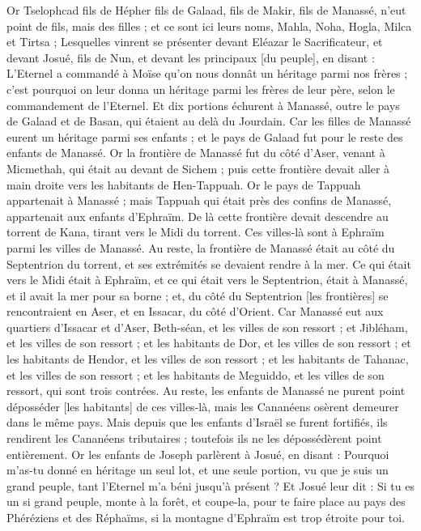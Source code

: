 \begin{multicols}{2}
Or Tselophcad fils de Hépher fils de Galaad, fils de Makir, fils de Manassé, n'eut point de fils, mais des filles ; et ce sont ici leurs noms, Mahla, Noha, Hogla, Milca et Tirtsa ;
Lesquelles vinrent se présenter devant Eléazar le Sacrificateur, et devant Josué, fils de Nun, et devant les principaux [du peuple], en disant : L'Eternel a commandé à Moïse qu'on nous donnât un héritage parmi nos frères ; c'est pourquoi on leur donna un héritage parmi les frères de leur père, selon le commandement de l'Eternel.
Et dix portions échurent à Manassé, outre le pays de Galaad et de Basan, qui étaient au delà du Jourdain.
Car les filles de Manassé eurent un héritage parmi ses enfants ; et le pays de Galaad fut pour le reste des enfants de Manassé.
Or la frontière de Manassé fut du côté d'Aser, venant à Micmethah, qui était au devant de Sichem ; puis cette frontière devait aller à main droite vers les habitants de Hen-Tappuah.
Or le pays de Tappuah appartenait à Manassé ; mais Tappuah qui était près des confins de Manassé, appartenait aux enfants d'Ephraïm.
De là cette frontière devait descendre au torrent de Kana, tirant vers le Midi du torrent. Ces villes-là sont à Ephraïm parmi les villes de Manassé. Au reste, la frontière de Manassé était au côté du Septentrion du torrent, et ses extrémités se devaient rendre à la mer.
Ce qui était vers le Midi était à Ephraïm, et ce qui était vers le Septentrion, était à Manassé, et il avait la mer pour sa borne ; et, du côté du Septentrion [les frontières] se rencontraient en Aser, et en Issacar, du côté d'Orient.
Car Manassé eut aux quartiers d'Issacar et d'Aser, Beth-séan, et les villes de son ressort ; et Jibléham, et les villes de son ressort ; et les habitants de Dor, et les villes de son ressort ; et les habitants de Hendor, et les villes de son ressort ; et les habitants de Tahanac, et les villes de son ressort ; et les habitants de Meguiddo, et les villes de son ressort, qui sont trois contrées.
Au reste, les enfants de Manassé ne purent point déposséder [les habitants] de ces villes-là, mais les Cananéens osèrent demeurer dans le même pays.
Mais depuis que les enfants d'Israël se furent fortifiés, ils rendirent les Cananéens tributaires ; toutefois ils ne les dépossédèrent point entièrement.
Or les enfants de Joseph parlèrent à Josué, en disant : Pourquoi m'as-tu donné en héritage un seul lot, et une seule portion, vu que je suis un grand peuple, tant l'Eternel m'a béni jusqu'à présent ?
Et Josué leur dit : Si tu es un si grand peuple, monte à la forêt, et coupe-la, pour te faire place au pays des Phéréziens et des Réphaïms, si la montagne d'Ephraïm est trop étroite pour toi.

\end{multicols}

